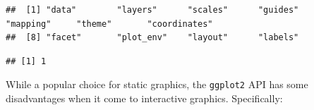 \documentclass[
]{book}
\newenvironment{Shaded}{\begin{snugshade}}{\end{snugshade}}
\newcommand{\FunctionTok}[1]{\textcolor[rgb]{0.13,0.29,0.53}{\textbf{#1}}}
\newcommand{\NormalTok}[1]{#1}
\newcommand{\SpecialCharTok}[1]{\textcolor[rgb]{0.81,0.36,0.00}{\textbf{#1}}}
\theoremstyle{definition}
\theoremstyle{definition}
\theoremstyle{definition}
\theoremstyle{definition}
\theoremstyle{remark}
\begin{document}
\begin{verbatim}
##  [1] "data"        "layers"      "scales"      "guides"      "mapping"     "theme"       "coordinates"
##  [8] "facet"       "plot_env"    "layout"      "labels"
\end{verbatim}

\begin{Shaded}
\end{Shaded}

\begin{verbatim}
## [1] 1
\end{verbatim}

While a popular choice for static graphics, the \texttt{ggplot2} API has some disadvantages when it come to interactive graphics. Specifically:
\end{document}

